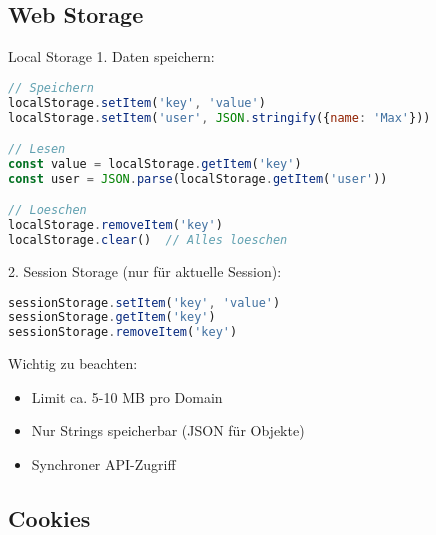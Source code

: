 \subsection{Web Storage}

\begin{KR}{Local Storage}
1. Daten speichern:
\begin{lstlisting}[language=JavaScript, style=basesmol]
// Speichern
localStorage.setItem('key', 'value')
localStorage.setItem('user', JSON.stringify({name: 'Max'}))

// Lesen
const value = localStorage.getItem('key')
const user = JSON.parse(localStorage.getItem('user'))

// Loeschen
localStorage.removeItem('key')
localStorage.clear()  // Alles loeschen
\end{lstlisting}

2. Session Storage (nur für aktuelle Session):
\begin{lstlisting}[language=JavaScript, style=basesmol]
sessionStorage.setItem('key', 'value')
sessionStorage.getItem('key')
sessionStorage.removeItem('key')
\end{lstlisting}

Wichtig zu beachten:
\begin{itemize}
  \item Limit ca. 5-10 MB pro Domain
  \item Nur Strings speicherbar (JSON für Objekte)
  \item Synchroner API-Zugriff
\end{itemize}
\end{KR}

\subsection{Cookies}

